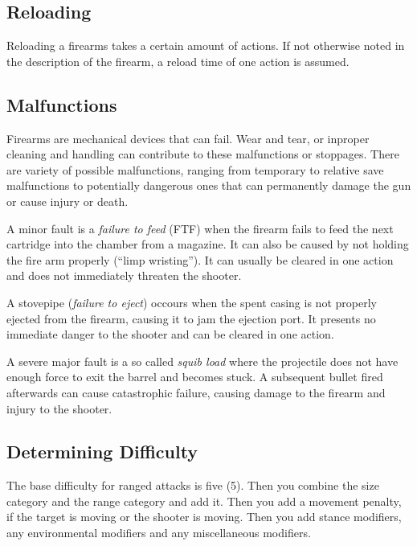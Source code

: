 \subsection{Reloading}
\label{sub:6-Reloading}

Reloading a firearms takes a certain amount of actions. If not otherwise noted
in the description of the firearm, a reload time of one action is assumed.

\subsection{Malfunctions}
\label{sub:6-Malfunctions}

Firearms are mechanical devices that can fail. Wear and tear, or inproper
cleaning and handling can contribute to these malfunctions or stoppages. There
are variety of possible malfunctions, ranging from temporary to relative save
malfunctions to potentially dangerous ones that can permanently damage the gun
or cause injury or death.

A minor fault is a \emph{failure to feed} (FTF) when the firearm fails to feed
the next cartridge into the chamber from a magazine. It can also be caused by
not holding the fire arm properly (``limp wristing''). It can usually be cleared
in one action and does not immediately threaten the shooter.

A stovepipe (\emph{failure to eject}) occours when the spent casing is not
properly ejected from the firearm, causing it to jam the ejection port. It
presents no immediate danger to the shooter and can be cleared in one action.

A severe major fault is a so called \emph{squib load} where the projectile does
not have enough force to exit the barrel and becomes stuck. A subsequent bullet
fired afterwards can cause catastrophic failure, causing damage to the firearm
and injury to the shooter.

\subsection{Determining Difficulty}
\label{sub:6-Determining Difficulty}

The base difficulty for ranged attacks is five (5). Then you combine the size
category and the range category and add it. Then you add a movement penalty,
if the target is moving or the shooter is moving. Then you add stance modifiers,
any environmental modifiers and any miscellaneous modifiers.

